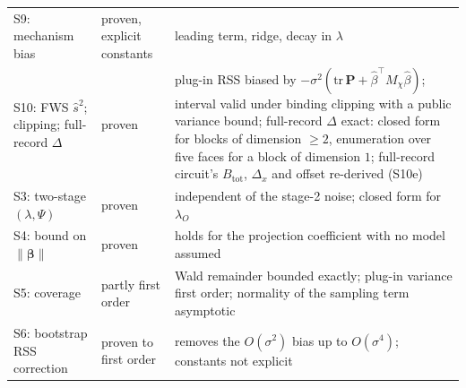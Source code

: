 \documentclass[11pt]{article}
\begin{document}
{\begin{xltabular}{\textwidth}{@{}>{\raggedright\arraybackslash}p{3.9cm}>{\raggedright\arraybackslash}p{2.5cm}>{\raggedright\arraybackslash}X@{}}
S9: mechanism bias & proven, explicit constants & leading term, ridge, decay in $\lambda$ \\
S10: FWS $\hat s^2$; clipping; full-record $\Delta$ & proven & plug-in RSS biased by $-\sigma^2(\mathrm{tr}\,\mathbf P+\hat\beta^\top M_\chi\hat\beta)$; interval valid under binding clipping with a public variance bound; full-record $\Delta$ exact: closed form for blocks of dimension $\ge2$, enumeration over five faces for a block of dimension $1$; full-record circuit's $B_{\mathrm{tot}}$, $\Delta_x$ and offset re-derived (S10e) \\
S3: two-stage $(\lambda,\Psi)$ & proven & independent of the stage-2 noise; closed form for $\lambda_O$ \\
S4: bound on $\|\boldsymbol\beta\|$ & proven & holds for the projection coefficient with no model assumed \\
S5: coverage & partly first order & Wald remainder bounded exactly; plug-in variance first order; normality of the sampling term asymptotic \\
S6: bootstrap RSS correction & proven to first order & removes the $O(\sigma^2)$ bias up to $O(\sigma^4)$; constants not explicit \\
\bottomrule
\end{xltabular}}
\end{document}
